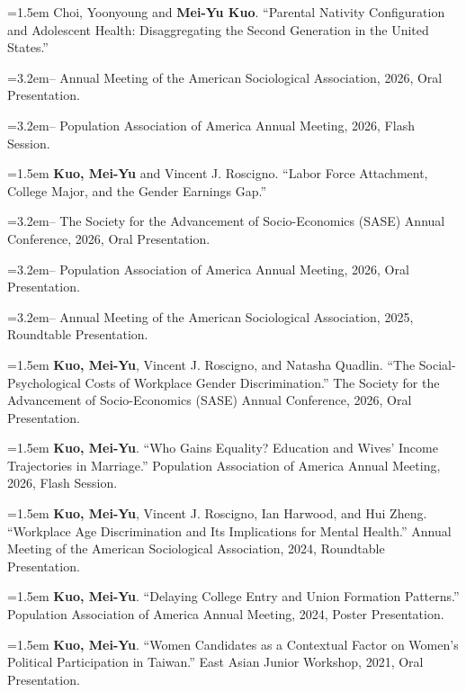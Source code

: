 
\begingroup
{}
\newcommand{\confpaper}[2]{\par\vspace{4pt}\noindent\hangindent=1.5em\hangafter=1 #1. ``#2.''\par}
\newcommand{\venue}[3]{\par\noindent\hangindent=3.2em\hangafter=1\hspace*{1.5em}-- #1, #2, #3.\par}
\newcommand{\confsingle}[5]{\par\vspace{4pt}\noindent\hangindent=1.5em #1. ``#2.'' #3, #4, #5.\par}

\confpaper{Choi, Yoonyoung and \textbf{Mei-Yu Kuo}}{Parental Nativity Configuration and Adolescent Health: Disaggregating the Second Generation in the United States}
\venue{Annual Meeting of the American Sociological Association}{2026}{Oral Presentation}
\venue{Population Association of America Annual Meeting}{2026}{Flash Session}

\confpaper{\textbf{Kuo, Mei-Yu} and Vincent J. Roscigno}{Labor Force Attachment, College Major, and the Gender Earnings Gap}
\venue{The Society for the Advancement of Socio-Economics (SASE) Annual Conference}{2026}{Oral Presentation}
\venue{Population Association of America Annual Meeting}{2026}{Oral Presentation}
\venue{Annual Meeting of the American Sociological Association}{2025}{Roundtable Presentation}

\confsingle{\textbf{Kuo, Mei-Yu}, Vincent J. Roscigno, and Natasha Quadlin}{The Social-Psychological Costs of Workplace Gender Discrimination}{The Society for the Advancement of Socio-Economics (SASE) Annual Conference}{2026}{Oral Presentation}

\confsingle{\textbf{Kuo, Mei-Yu}}{Who Gains Equality? Education and Wives' Income Trajectories in Marriage}{Population Association of America Annual Meeting}{2026}{Flash Session}

\confsingle{\textbf{Kuo, Mei-Yu}, Vincent J. Roscigno, Ian Harwood, and Hui Zheng}{Workplace Age Discrimination and Its Implications for Mental Health}{Annual Meeting of the American Sociological Association}{2024}{Roundtable Presentation}

\confsingle{\textbf{Kuo, Mei-Yu}}{Delaying College Entry and Union Formation Patterns}{Population Association of America Annual Meeting}{2024}{Poster Presentation}

\confsingle{\textbf{Kuo, Mei-Yu}}{Women Candidates as a Contextual Factor on Women's Political Participation in Taiwan}{East Asian Junior Workshop}{2021}{Oral Presentation}
\endgroup
